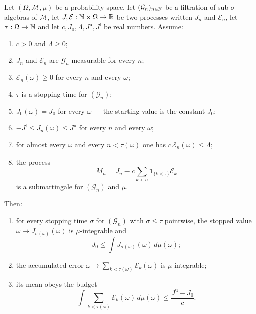 \begin{lemma}
Let $(\Omega,\mathcal M,\mu)$ be a probability space, let
$(\mathcal G_n)_{n\in\mathbb{N}}$ be a filtration of sub-$\sigma$-algebras of
$\mathcal M$, let $J,\mathcal E:\mathbb{N}\times\Omega\to\mathbb{R}$ be two processes written
$J_n$ and $\mathcal E_n$, let $\tau:\Omega\to\mathbb{N}$ and let
$c,J_0,\Lambda,J^{\mathrm u},J^{\mathrm l}$ be real numbers. Assume:
\begin{enumerate}
\item\label{it:oseb-c} $c>0$ and $\Lambda\ge0$;
\item\label{it:oseb-adapt} $J_n$ and $\mathcal E_n$ are $\mathcal
G_n$-measurable for every $n$;
\item\label{it:oseb-Enn} $\mathcal E_n(\omega)\ge0$ for every $n$ and every
$\omega$;
\item\label{it:oseb-tau} $\tau$ is a stopping time for $(\mathcal G_n)$;
\item\label{it:oseb-J0} $J_0(\omega)=J_0$ for every $\omega$ --- the starting
value is the constant $J_0$;
\item\label{it:oseb-bds} $-J^{\mathrm l}\le J_n(\omega)\le J^{\mathrm u}$ for
every $n$ and every $\omega$;
\item\label{it:oseb-Eball} for almost every $\omega$ and every $n<\tau(\omega)$
one has $c\,\mathcal E_n(\omega)\le\Lambda$;
\item\label{it:oseb-sub} the process
\[
  M_n=J_n-c\sum_{k<n}\mathbf 1_{\{k<\tau\}}\mathcal E_k
\]
is a submartingale for $(\mathcal G_n)$ and $\mu$.
\end{enumerate}
Then:
\begin{enumerate}
\item[(i)] for every stopping time $\sigma$ for $(\mathcal G_n)$ with
$\sigma\le\tau$ pointwise, the stopped value $\omega\mapsto
J_{\sigma(\omega)}(\omega)$ is $\mu$-integrable and
\[
  J_0\le\int J_{\sigma(\omega)}(\omega)\,d\mu(\omega);
\]
\item[(ii)] the accumulated error
$\omega\mapsto\sum_{k<\tau(\omega)}\mathcal E_k(\omega)$ is $\mu$-integrable;
\item[(iii)] its mean obeys the budget
\[
  \int\sum_{k<\tau(\omega)}\mathcal E_k(\omega)\,d\mu(\omega)
   \le\frac{J^{\mathrm u}-J_0}{c} .
\]
\end{enumerate}
\end{lemma}
